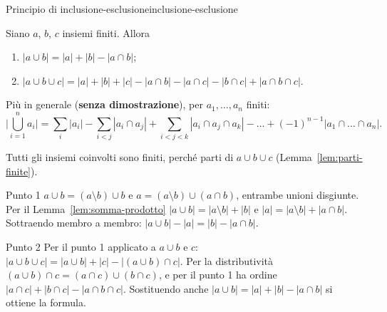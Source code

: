 \begin{concetto}
\begin{Teorema}{Principio di inclusione-esclusione}{inclusione-esclusione}
    \begin{prerequisiti}
    \end{prerequisiti}
    Siano $a$, $b$, $c$ insiemi finiti. Allora
    \begin{enumerate}
        \item $|a \cup b| = |a| + |b| - |a \cap b|$;
        \item $|a \cup b \cup c| = |a| + |b| + |c| - |a \cap b| - |a \cap c| - |b \cap c| + |a \cap b \cap c|$.
    \end{enumerate}
    Più in generale (\textbf{senza dimostrazione}), per $a_1, \dots, a_n$ finiti:
    \[ \Big|\bigcup_{i = 1}^{n} a_i\Big| = \sum_{i} |a_i| - \sum_{i < j} |a_i \cap a_j| + \sum_{i < j < k} |a_i \cap a_j \cap a_k| - \dots + (-1)^{n - 1} |a_1 \cap \dots \cap a_n|. \]
\end{Teorema}
\begin{dimostrazione}
    Tutti gli insiemi coinvolti sono finiti, perché parti di $a \cup b \cup c$ (Lemma~\ref{lem:parti-finite}).
    \begin{caso}{Punto 1}
        $a \cup b = (a \setminus b) \cup b$ e $a = (a \setminus b) \cup (a \cap b)$, entrambe unioni disgiunte. Per il Lemma~\ref{lem:somma-prodotto}
        $|a \cup b| = |a \setminus b| + |b|$ e $|a| = |a \setminus b| + |a \cap b|$. Sottraendo membro a membro: $|a \cup b| - |a| = |b| - |a \cap b|$.
    \end{caso}
    \begin{caso}{Punto 2}
        Per il punto 1 applicato a $a \cup b$ e $c$: $|a \cup b \cup c| = |a \cup b| + |c| - |(a \cup b) \cap c|$. Per la distributività
        $(a \cup b) \cap c = (a \cap c) \cup (b \cap c)$, e per il punto 1 ha ordine $|a \cap c| + |b \cap c| - |a \cap b \cap c|$. Sostituendo anche
        $|a \cup b| = |a| + |b| - |a \cap b|$ si ottiene la formula.
    \end{caso}
\end{dimostrazione}
\end{concetto}


